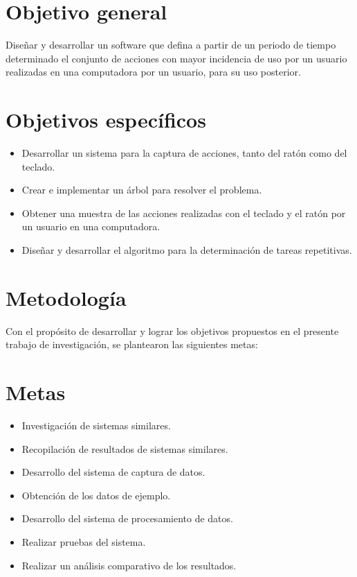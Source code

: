 \section{Objetivo general} 
Dise\~nar y desarrollar un software que defina a partir de un periodo de
 tiempo determinado el conjunto de acciones con mayor incidencia de uso por 
 un usuario realizadas en una computadora por un usuario, para su uso 
 posterior.

\section{Objetivos espec\'ificos}
\begin{itemize}
  \item Desarrollar un sistema para la captura de acciones, tanto del rat\'on
  como del teclado.
  \item Crear e implementar un \'arbol para resolver el problema.
  \item Obtener una muestra de las acciones realizadas con el teclado y el 
  rat\'on por un usuario en una computadora.
  \item Dise\~nar y desarrollar el algoritmo para la determinaci\'on de
  tareas repetitivas.
\end{itemize}

\section{Metodolog\'ia}
Con el prop\'osito de desarrollar y lograr los objetivos propuestos en el
 presente trabajo de investigaci\'on, se plantearon las siguientes metas:
\section*{Metas}
\begin{itemize}
  \item Investigaci\'on de sistemas similares.
  \item Recopilaci\'on de resultados de sistemas similares.
  \item Desarrollo del sistema  de captura de datos.
  \item Obtenci\'on de los datos de ejemplo.
  \item Desarrollo del sistema de procesamiento de datos.
  \item Realizar pruebas del sistema.
  \item Realizar un an\'alisis comparativo de los resultados.
\end{itemize}
